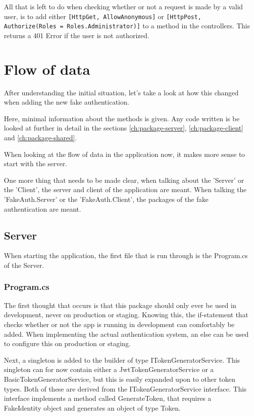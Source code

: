 All that is left to do when checking whether or not a request is made by a valid user, is to add either \texttt{[HttpGet, AllowAnonymous]} or \texttt{[HttpPost, Authorize(Roles = Roles.Administrator)]} to a method in the controllers. This returns a 401 Error if the user is not authorized.

\section{Flow of data}

After understanding the initial situation, let's take a look at how this changed when adding the new fake authentication.

Here, minimal information about the methods is given. Any code written is be looked at further in detail in the sections \ref{ch:package-server}, \ref{ch:package-client} and \ref{ch:package-shared}.

When looking at the flow of data in the application now, it makes more sense to start with the server.

One more thing that needs to be made clear, when talking about the 'Server' or the 'Client', the server and client of the application are meant. When talking the 'FakeAuth.Server' or the 'FakeAuth.Client', the packages of the fake authentication are meant.

\subsection{Server}

When starting the application, the first file that is run through is the Program.cs of the Server.

\subsubsection{Program.cs}

The first thought that occurs is that this package should only ever be used in development, never on production or staging. Knowing this, the if-statement that checks whether or not the app is running in development can comfortably be added. When implementing the actual authentication system, an else can be used to configure this on production or staging.

Next, a singleton is added to the builder of type ITokenGeneratorService. This singleton can for now contain either a JwtTokenGeneratorService or a BasicTokenGeneratorService, but this is easily expanded upon to other token types. Both of these are derived from the ITokenGeneratorService interface. This interface implements a method called GenerateToken, that requires a FakeIdentity object and generates an object of type Token.

